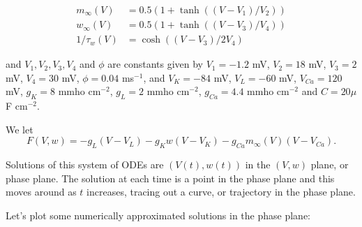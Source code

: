 \documentclass[11pt]{article}
\begin{document}
\begin{align*}
m_\infty(V) &= 0.5(1 + \tanh((V-V_1)/V_2))\\
w_\infty(V) & = 0.5(1+\tanh((V-V_3)/V_4))\\
1/\tau_w(V) & = \cosh((V-V_3)/2V_4)
\end{align*}

and \(V_1, V_2, V_3, V_4\) and \(\phi\) are constants given by
\(V_1=-1.2\) mV, \(V_2 = 18\) mV, \(V_3 = 2\) mV, \(V_4= 30\) mV,
\(\phi=0.04\) ms\(^{-1}\), and \(V_K= -84\) mV, \(V_L=-60\) mV,
\(V_{Ca} = 120\) mV, \(g_K=8\) mmho cm\(^{-2}\), \(g_L=2\) mmho
cm\(^{-2}\), \(g_{Ca}=4.4\) mmho cm\(^{-2}\) and \(C=20 \mu\)F
cm\(^{-2}\).

We let
\[F(V, w) = - g_{L}(V-V_L) - g_K w (V-V_K) - g_{Ca}m_\infty(V)(V-V_{Ca}).\]

Solutions of this system of ODEs are \((V(t), w(t))\) in the \((V, w)\)
plane, or phase plane. The solution at each time is a point in the phase
plane and this moves around as \(t\) increases, tracing out a curve, or
trajectory in the phase plane.

Let's plot some numerically approximated solutions in the phase plane:
\end{document}
